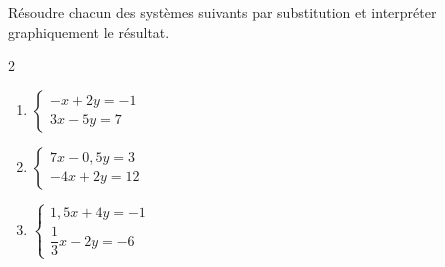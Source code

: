 \begin{exo}{}
	Résoudre chacun des systèmes suivants par substitution et interpréter graphiquement le résultat.
	\vspace*{-2mm}
	\begin{multicols}{2}
	\begin{enumerate}
		\item $\begin{cases} -x + 2y = -1 \\ 3x - 5y = 7 \end{cases}$
		\item $\begin{cases} 7x - 0,5y = 3 \\ -4x + 2y = 12 \end{cases}$
		\item $\begin{cases} 1,5x + 4y = -1 \\ \dfrac{1}{3}x - 2y = -6 \end{cases}$
	\end{enumerate}
	\end{multicols}
\end{exo}
